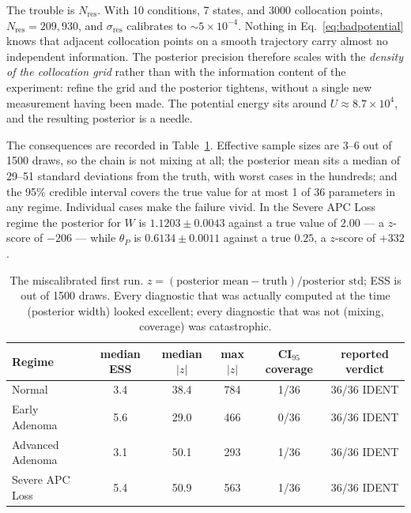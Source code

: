 \documentclass[11pt]{article}
\newcommand{\thP}{\theta_P}
\begin{document}
The trouble is $N_{\text{res}}$. With 10 conditions, 7 states, and 3000
collocation points, $N_{\text{res}} = 209{,}930$, and $\sigma_{\text{res}}$
calibrates to $\sim\!5\times10^{-4}$. Nothing in Eq.~\eqref{eq:badpotential}
knows that adjacent collocation points on a smooth trajectory carry almost no
independent information. The posterior precision therefore scales with the
\emph{density of the collocation grid} rather than with the information content
of the experiment: refine the grid and the posterior tightens, without a single
new measurement having been made. The potential energy sits around
$U \approx 8.7\times 10^{4}$, and the resulting posterior is a needle.

The consequences are recorded in Table~\ref{tab:bayesfail}. Effective sample
sizes are 3--6 out of 1500 draws, so the chain is not mixing at all; the
posterior mean sits a median of 29--51 standard deviations from the truth,
with worst cases in the hundreds; and the 95\% credible interval covers the
true value for at most 1 of 36 parameters in any regime. Individual cases make
the failure vivid. In the Severe APC Loss regime the posterior for $W$ is
$1.1203 \pm 0.0043$ against a true value of $2.00$ --- a $z$-score of $-206$
--- while $\thP$ is $0.6134 \pm 0.0011$ against a true $0.25$, a $z$-score of
$+332$.

\begin{table}[H]
\centering
\small
\setlength{\tabcolsep}{5pt}
\begin{tabular}{lccccc}
\toprule
\textbf{Regime} & \textbf{median ESS} & \textbf{median $|z|$} &
\textbf{max $|z|$} & \textbf{CI$_{95}$ coverage} &
\textbf{reported verdict} \\
\midrule
Normal            & 3.4 & 38.4 & 784 & 1/36 & 36/36 IDENT \\
Early Adenoma     & 5.6 & 29.0 & 466 & 0/36 & 36/36 IDENT \\
Advanced Adenoma  & 3.1 & 50.1 & 293 & 1/36 & 36/36 IDENT \\
Severe APC Loss   & 5.4 & 50.9 & 563 & 1/36 & 36/36 IDENT \\
\bottomrule
\end{tabular}
\caption{The miscalibrated first run. $z = (\text{posterior mean} -
\text{truth})/\text{posterior std}$; ESS is out of 1500 draws. Every diagnostic
that was actually computed at the time (posterior width) looked excellent;
every diagnostic that was not (mixing, coverage) was catastrophic.}
\label{tab:bayesfail}
\end{table}
\end{document}
